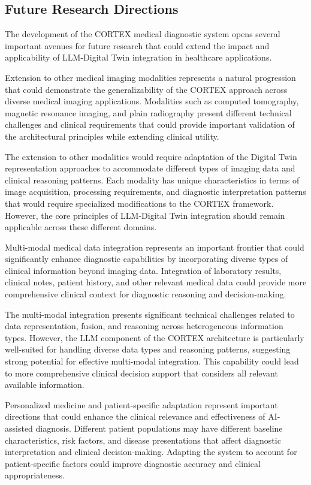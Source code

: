 \subsection{Future Research Directions}

The development of the CORTEX medical diagnostic system opens several important avenues for future research that could extend the impact and applicability of LLM-Digital Twin integration in healthcare applications.

Extension to other medical imaging modalities represents a natural progression that could demonstrate the generalizability of the CORTEX approach across diverse medical imaging applications. Modalities such as computed tomography, magnetic resonance imaging, and plain radiography present different technical challenges and clinical requirements that could provide important validation of the architectural principles while extending clinical utility.

The extension to other modalities would require adaptation of the Digital Twin representation approaches to accommodate different types of imaging data and clinical reasoning patterns. Each modality has unique characteristics in terms of image acquisition, processing requirements, and diagnostic interpretation patterns that would require specialized modifications to the CORTEX framework. However, the core principles of LLM-Digital Twin integration should remain applicable across these different domains.

Multi-modal medical data integration represents an important frontier that could significantly enhance diagnostic capabilities by incorporating diverse types of clinical information beyond imaging data. Integration of laboratory results, clinical notes, patient history, and other relevant medical data could provide more comprehensive clinical context for diagnostic reasoning and decision-making.

The multi-modal integration presents significant technical challenges related to data representation, fusion, and reasoning across heterogeneous information types. However, the LLM component of the CORTEX architecture is particularly well-suited for handling diverse data types and reasoning patterns, suggesting strong potential for effective multi-modal integration. This capability could lead to more comprehensive clinical decision support that considers all relevant available information.

Personalized medicine and patient-specific adaptation represent important directions that could enhance the clinical relevance and effectiveness of AI-assisted diagnosis. Different patient populations may have different baseline characteristics, risk factors, and disease presentations that affect diagnostic interpretation and clinical decision-making. Adapting the system to account for patient-specific factors could improve diagnostic accuracy and clinical appropriateness.

